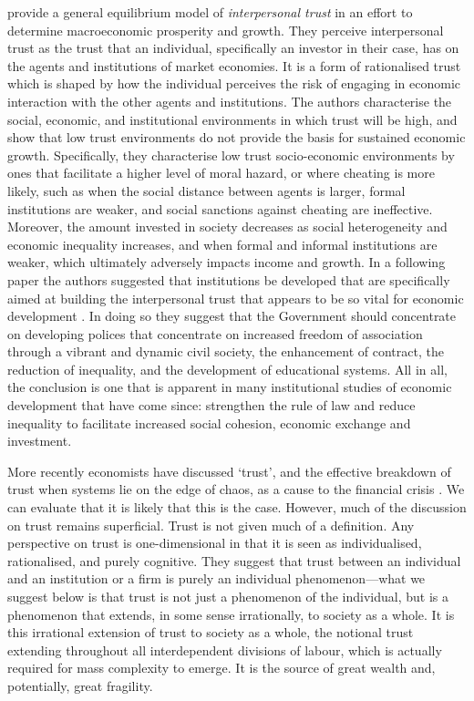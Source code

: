 \begin{subappendices}
\citet{ZakKnack2001} provide a general equilibrium model of \textit{interpersonal trust} in an effort to determine macroeconomic prosperity and growth. They perceive interpersonal trust as the trust that an individual, specifically an investor in their case, has on the agents and institutions of market economies. It is a form of rationalised trust which is shaped by how the individual perceives the risk of engaging in economic interaction with the other agents and institutions. The authors characterise the social, economic, and institutional environments in which trust will be high, and show that low trust environments do not provide the basis for sustained economic growth. Specifically, they characterise low trust socio-economic environments by ones that facilitate a higher level of  moral hazard, or where cheating is more likely, such as when the social distance between agents is larger, formal institutions are weaker, and social sanctions against cheating are ineffective. Moreover, the amount invested in society decreases as social heterogeneity and economic inequality increases, and when formal and informal institutions are weaker, which ultimately adversely impacts income and growth. In a following paper the authors suggested that institutions be developed that are specifically aimed at building the interpersonal trust that appears to be so vital for economic development \citep{KnackZak2003}. In doing so they suggest that the Government should concentrate on developing polices that concentrate on increased freedom of association through a vibrant and dynamic civil society, the enhancement of contract, the reduction of inequality, and the development of educational systems. All in all, the conclusion is one that is apparent in many institutional studies of economic development that have come since: strengthen the rule of law and reduce inequality to facilitate increased social cohesion, economic exchange and investment.

More recently economists have discussed `trust', and the effective breakdown of trust when systems lie on the edge of chaos, as a cause to the financial crisis \citep{Shiller2008, Tonkiss2009}. We can evaluate that it is likely that this is the case. However, much of the discussion on trust remains superficial. Trust is not given much of a definition. Any perspective on trust is one-dimensional in that it is seen as individualised, rationalised, and purely cognitive. They suggest that trust between an individual and an institution or a firm is purely an individual phenomenon---what we suggest below is that trust is not just a phenomenon of the individual, but is a phenomenon that extends, in some sense irrationally, to society as a whole. It is this irrational extension of trust to society as a whole, the notional trust extending throughout all interdependent divisions of labour, which is actually required for mass complexity to emerge. It is the source of great wealth and, potentially, great fragility.


\end{subappendices}
